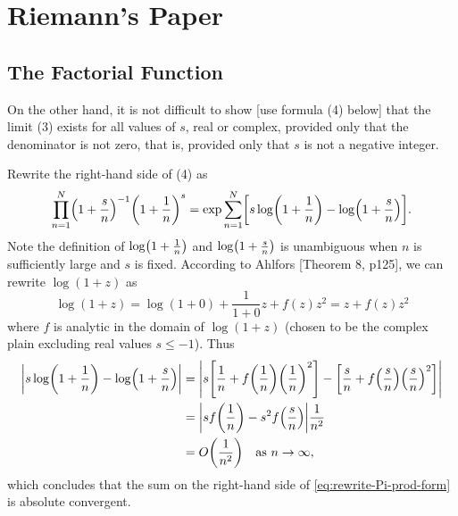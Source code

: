 \documentclass{note}
\numberwithin{equation}{chapter}
\begin{document}
\chapter{Riemann's Paper}

\setcounter{section}{2}
\section{The Factorial Function}


\begin{quotebar}
    On the other hand, it is not difficult to show [use formula (4) below] that the
    limit (3) exists for all values of $s$, real or complex, provided only that the
    denominator is not zero, that is, provided only that $s$ is not a negative
    integer.
\end{quotebar}

Rewrite the right-hand side of (4) as
\begin{equation}
    \prod_{n=1}^N \prn{1+\frac{s}{n}}^{-1} \prn{1+\frac{1}{n}}^{s} = \exp{
        \sum_{n=1}^N \left[s\log\prn{1+\frac{1}{n}} - \log\prn{1+\frac{s}{n}} \right]}.
    \label{eq:rewrite-Pi-prod-form}
\end{equation}
Note the definition of $\log\prn{1+\frac{1}{n}}$ and $\log\prn{1+\frac{s}{n}}$
is unambiguous when $n$ is sufficiently large and $s$ is fixed. According to
Ahlfors [Theorem 8, p125], we can rewrite $\log(1+z)$ as
\begin{equation*}
    \log(1+z) = \log(1+0) + \frac{1}{1+0}z + f(z)z^2 = z + f(z)z^2
\end{equation*}
where $f$ is analytic in the domain of $\log(1+z)$ (chosen to be the complex
plain excluding real values $s \leq -1$). Thus
\begin{align}
    \abs{s\log\prn{1+\frac{1}{n}} - \log\prn{1+\frac{s}{n}}}
     & = \abs{ s\left[ \frac{1}{n} + f\prn{\frac{1}{n}}\prn{\frac{1}{n}}^2 \right] -
    \left[ \frac{s}{n} + f\prn{\frac{s}{n}}\prn{\frac{s}{n}}^2 \right] } \nonumber   \\
     & = \abs{ s f\prn{\frac{1}{n}} - s^2 f\prn{\frac{s}{n}} } \frac{1}{n^2}
    \label{eq:Pi-prod-summand-taylor}                                                \\
     & = O\prn{\frac{1}{n^2}} \quad \text{as } n \rightarrow \infty, \nonumber
\end{align}
which concludes that the sum on the right-hand side of
\eqref{eq:rewrite-Pi-prod-form} is absolute convergent.
\end{document}

